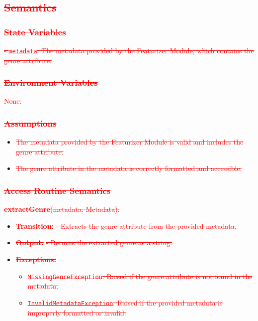 \documentclass[12pt, titlepage]{article}
\begin{document}
\subsection{\textcolor{red}{\sout{Semantics}}}

\subsubsection{\textcolor{red}{\sout{State Variables}}}
\textcolor{red}{\sout{- \texttt{metadata}: The metadata provided by the Featurizer Module, which contains the genre attribute.}}

\subsubsection{\textcolor{red}{\sout{Environment Variables}}}
\textcolor{red}{\sout{None.}}

\subsubsection{\textcolor{red}{\sout{Assumptions}}}
\begin{itemize}
\item \textcolor{red}{\sout{The metadata provided by the Featurizer Module is valid and includes the genre attribute.}}
\item \textcolor{red}{\sout{The genre attribute in the metadata is correctly formatted and accessible.}}
\end{itemize}

\subsubsection{\textcolor{red}{\sout{Access Routine Semantics}}}

\noindent \textcolor{red}{\sout{\textbf{extractGenre}(metadata: Metadata):}}
\begin{itemize}
\item \textcolor{red}{\sout{\textbf{Transition:}}}
    \textcolor{red}{\sout{- Extracts the genre attribute from the provided metadata.}}
\item \textcolor{red}{\sout{\textbf{Output:}}}
    \textcolor{red}{\sout{- Returns the extracted genre as a string.}}
\item \textcolor{red}{\sout{\textbf{Exceptions:}}}
    \begin{itemize}
    \item \textcolor{red}{\sout{\texttt{MissingGenreException}: Raised if the genre attribute is not found in the metadata.}}
    \item \textcolor{red}{\sout{\texttt{InvalidMetadataException}: Raised if the provided metadata is improperly formatted or invalid.}}
    \end{itemize}
\end{itemize}
\end{document}
